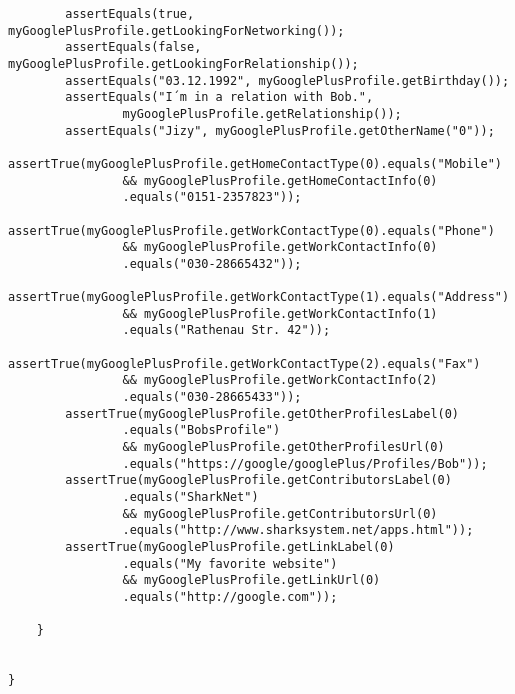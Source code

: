 \documentclass[12pt]{article}
\begin{document}
\begin{verbatim}
        assertEquals(true, myGooglePlusProfile.getLookingForNetworking());
        assertEquals(false, myGooglePlusProfile.getLookingForRelationship());
        assertEquals("03.12.1992", myGooglePlusProfile.getBirthday());
        assertEquals("I´m in a relation with Bob.",
                myGooglePlusProfile.getRelationship());
        assertEquals("Jizy", myGooglePlusProfile.getOtherName("0"));
        assertTrue(myGooglePlusProfile.getHomeContactType(0).equals("Mobile")
                && myGooglePlusProfile.getHomeContactInfo(0)
                .equals("0151-2357823"));
        assertTrue(myGooglePlusProfile.getWorkContactType(0).equals("Phone") 
                && myGooglePlusProfile.getWorkContactInfo(0)
                .equals("030-28665432"));
        assertTrue(myGooglePlusProfile.getWorkContactType(1).equals("Address")
                && myGooglePlusProfile.getWorkContactInfo(1)
                .equals("Rathenau Str. 42"));
        assertTrue(myGooglePlusProfile.getWorkContactType(2).equals("Fax")
                && myGooglePlusProfile.getWorkContactInfo(2)
                .equals("030-28665433"));
        assertTrue(myGooglePlusProfile.getOtherProfilesLabel(0)
                .equals("BobsProfile")
                && myGooglePlusProfile.getOtherProfilesUrl(0)
                .equals("https://google/googlePlus/Profiles/Bob"));
        assertTrue(myGooglePlusProfile.getContributorsLabel(0)
                .equals("SharkNet") 
                && myGooglePlusProfile.getContributorsUrl(0)
                .equals("http://www.sharksystem.net/apps.html"));
        assertTrue(myGooglePlusProfile.getLinkLabel(0)
                .equals("My favorite website") 
                && myGooglePlusProfile.getLinkUrl(0)        
                .equals("http://google.com"));

    }

    
} 
\end{verbatim}
\end{document}
